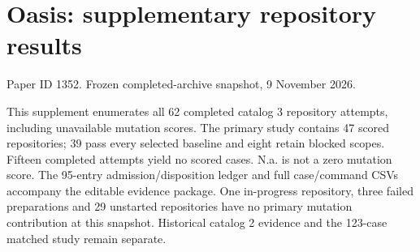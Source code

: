 

\section*{Oasis: supplementary repository results}
\noindent Paper ID 1352. Frozen completed-archive snapshot, 9 November 2026.\par
This supplement enumerates all 62 completed catalog 3 repository attempts, including unavailable mutation scores. The primary study contains 47 scored repositories; 39 pass every selected baseline and eight retain blocked scopes. Fifteen completed attempts yield no scored cases. N.a. is not a zero mutation score. The 95-entry admission/disposition ledger and full case/command CSVs accompany the editable evidence package. One in-progress repository, three failed preparations and 29 unstarted repositories have no primary mutation contribution at this snapshot. Historical catalog 2 evidence and the 123-case matched study remain separate.

\clearpage


